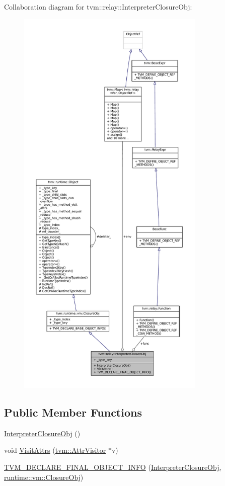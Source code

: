 Collaboration diagram for tvm\+:\+:relay\+:\+:Interpreter\+Closure\+Obj\+:
\nopagebreak
\begin{figure}[H]
\begin{center}
\leavevmode
\includegraphics[height=550pt]{classtvm_1_1relay_1_1InterpreterClosureObj__coll__graph}
\end{center}
\end{figure}
\subsection*{Public Member Functions}
\begin{DoxyCompactItemize}
\item 
\hyperlink{classtvm_1_1relay_1_1InterpreterClosureObj_afa6b5fa7a2161a4e1cabadf36ca4cd4c}{Interpreter\+Closure\+Obj} ()
\item 
void \hyperlink{classtvm_1_1relay_1_1InterpreterClosureObj_af407252df5d56446c79bd2b96a947fee}{Visit\+Attrs} (\hyperlink{classtvm_1_1AttrVisitor}{tvm\+::\+Attr\+Visitor} $\ast$v)
\item 
\hyperlink{classtvm_1_1relay_1_1InterpreterClosureObj_a10c0738fdf991b20a017ca7de0acec6d}{T\+V\+M\+\_\+\+D\+E\+C\+L\+A\+R\+E\+\_\+\+F\+I\+N\+A\+L\+\_\+\+O\+B\+J\+E\+C\+T\+\_\+\+I\+N\+FO} (\hyperlink{classtvm_1_1relay_1_1InterpreterClosureObj}{Interpreter\+Closure\+Obj}, \hyperlink{classtvm_1_1runtime_1_1vm_1_1ClosureObj}{runtime\+::vm\+::\+Closure\+Obj})
\end{DoxyCompactItemize}
